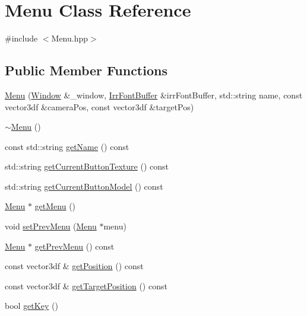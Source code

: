 \hypertarget{class_menu}{}\section{Menu Class Reference}
\label{class_menu}


{\ttfamily \#include $<$Menu.\+hpp$>$}

\subsection*{Public Member Functions}
\begin{DoxyCompactItemize}
\item 
\mbox{\hyperlink{class_menu_a11bdc9ab879916fe9b8fbd1d0c360a45}{Menu}} (\mbox{\hyperlink{class_window}{Window}} \&\+\_\+window, \mbox{\hyperlink{class_irr_font_buffer}{Irr\+Font\+Buffer}} \&irr\+Font\+Buffer, std\+::string name, const vector3df \&camera\+Pos, const vector3df \&target\+Pos)
\item 
\mbox{\hyperlink{class_menu_a831387f51358cfb88cd018e1777bc980}{$\sim$\+Menu}} ()
\item 
const std\+::string \mbox{\hyperlink{class_menu_aa8de5fb849c062542a390bd1a6494602}{get\+Name}} () const
\item 
std\+::string \mbox{\hyperlink{class_menu_a2d80778321bd29e0ba8d17efd59eb6ff}{get\+Current\+Button\+Texture}} () const
\item 
std\+::string \mbox{\hyperlink{class_menu_af6bbe099006c79f939910b1109be4ce5}{get\+Current\+Button\+Model}} () const
\item 
\mbox{\hyperlink{class_menu}{Menu}} $\ast$ \mbox{\hyperlink{class_menu_af8f1a84e17db62dbf0aa91b7d7aeeca2}{get\+Menu}} ()
\item 
void \mbox{\hyperlink{class_menu_a1b31b024f1504e95e883164895929084}{set\+Prev\+Menu}} (\mbox{\hyperlink{class_menu}{Menu}} $\ast$menu)
\item 
\mbox{\hyperlink{class_menu}{Menu}} $\ast$ \mbox{\hyperlink{class_menu_a35cba1773e1c1df44ac830133d461320}{get\+Prev\+Menu}} () const
\item 
const vector3df \& \mbox{\hyperlink{class_menu_a41ba3aaa9818176a6a956956edff67d8}{get\+Position}} () const
\item 
const vector3df \& \mbox{\hyperlink{class_menu_a41bc0c154f360e94b05e6a6da8ef9ac7}{get\+Target\+Position}} () const
\item 
bool \mbox{\hyperlink{class_menu_a30af92ed09a79c7c7309250790735f1a}{get\+Key}} ()
\item 

\end{DoxyCompactItemize}
